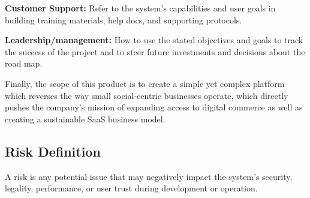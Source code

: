 \textbf{Customer Support:} Refer to the system's capabilities and user goals in building training materials, help docs, and supporting protocols.  

\textbf{Leadership/management:} How to use the stated objectives and goals to track the success of the project and to steer future investments and decisions about the road map. 

Finally, the scope of this product is to create a simple yet complex platform which reverses the way small social-centric businesses operate, which directly pushes the company's mission of expanding access to digital commerce as well as creating a sustainable SaaS business model.

\subsection{Risk Definition}
A risk is any potential issue that may negatively impact the system’s security, legality, performance, or user trust during development or operation.

